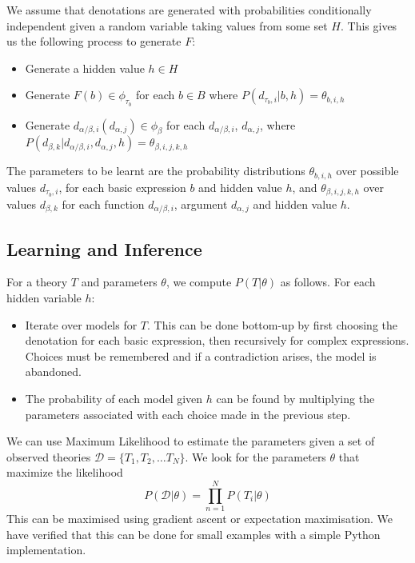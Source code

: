 \documentclass[a4paper,11pt]{article}
\theoremstyle{definition}
\newcommand{\interp}[1]{[\![ #1 ]\!]}
\begin{document}
We assume that denotations are generated with probabilities
conditionally independent given a random variable taking values from
some set $H$. This gives us the following process to generate $F$:
\begin{itemize}
\item Generate a hidden value $h\in H$
\item Generate $F(b) \in \phi_{\tau_b}$ for each $b\in B$ where
  $P(d_{\tau_b,i}|b, h) = \theta_{b,i,h}$
\item Generate $d_{\alpha/\beta,i}(d_{\alpha,j}) \in \phi_\beta$ for each $d_{\alpha/\beta,i}$, $d_{\alpha,j}$,
where $P(d_{\beta,k}|d_{\alpha/\beta,i}, d_{\alpha,j},h) = \theta_{\beta,i,j,k,h}$
\end{itemize}
The parameters to be learnt are the probability distributions
$\theta_{b,i,h}$ 
over possible values $d_{\tau_b,i}$,
for each basic expression $b$ and hidden value $h$,
and $\theta_{\beta,i,j,k,h}$ over
values $d_{\beta,k}$ for each function $d_{\alpha/\beta,i}$, argument
$d_{\alpha,j}$ and hidden value $h$.

\subsection{Learning and Inference}

For a theory $T$ and parameters $\theta$, we compute $P(T|\theta)$ as follows. For each hidden variable $h$:
\begin{itemize}
\item Iterate over models for $T$. This can be done bottom-up
  by first choosing the denotation for each basic expression,
  then recursively for complex expressions. Choices must be
  remembered and if a contradiction arises, the
  model is abandoned.
\item The probability of each model given $h$ can be found by
  multiplying the parameters associated with each choice made in the
  previous step.
\end{itemize}

We can use Maximum Likelihood to estimate the parameters given a set
of observed theories $\mathcal{D} = \{T_1, T_2, \ldots T_N\}$. We look
for the parameters $\theta$ that maximize the likelihood
$$P(\mathcal{D}|\theta) = \prod_{n=1}^N P(T_i|\theta)$$ This can be
maximised using gradient ascent or expectation maximisation. We have
verified that this can be done for small examples with a simple Python
implementation.
\end{document}
